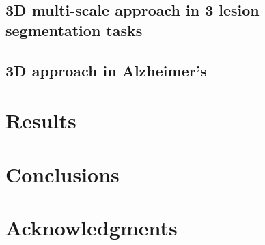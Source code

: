 \documentclass{sig-alternate}
\begin{document}
\subsection{3D multi-scale approach in 3 lesion segmentation tasks}
\label{sec:3DMultiScale}

\subsection{3D approach in Alzheimer's}
\label{sec:3DAlzheimers}



\section{Results}
\label{sec:results}


\section{Conclusions}
\label{sec:conclusions}



\section*{Acknowledgments}
\label{sec:acknowledgments}



  
\end{document}
